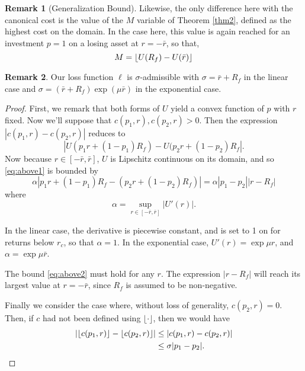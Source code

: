 \documentclass[11pt]{article}
\DeclarePairedDelimiter\floor{\lfloor}{\rfloor}
\theoremstyle{plain}
\theoremstyle{definition}
\newtheorem*{rem}{Remark}
\begin{document}
\begin{rem}[Generalization Bound]
  Likewise, the only difference here with the canonical cost is the value of the $M$
  variable of Theorem \ref{thm2}, defined as the highest cost on the domain. In the case
  here, this value is again reached for an investment $p=1$ on a losing asset at $r=-\bar
  r$, so that,
  \begin{equation}
    M = \floor{U(R_f) - U(\bar r)}
  \end{equation}
\end{rem}







\newpage
\begin{rem}
  Our loss function $\ell$ is $\sigma$-admissible with $\sigma=\bar r+R_f$ in the linear
  case and $\sigma=(\bar r+R_f)\exp(\mu\bar r)$ in the exponential case.
\end{rem}

\begin{proof}
  First, we remark that both forms of $U$ yield a convex function of $p$ with $r$ fixed. 
  Now we'll suppose that $c(p_1,r), c(p_2,r) > 0$. Then the expression
  $|c(p_1,r)-c(p_2,r)|$ reduces to
  \begin{equation}
    |U(p_1r + (1-p_1)R_f) - U(p_2r + (1-p_2)R_f|.
  \end{equation}
  Now because $r\in[-\bar r,\bar r]$, $U$ is Lipschitz continuous on its domain, and so
  \eqref{eq:above1} is bounded by
  \begin{equation}
    \alpha |p_1r + (1-p_1)R_f - (p_2r + (1-p_2)R_f)| = \alpha|p_1-p_2||r-R_f|
  \end{equation}
  where
  \begin{equation}
    \alpha = \sup_{r\in[-\bar r,\bar r]} |U'(r)|.
  \end{equation}

  In the linear case, the derivative is piecewise constant, and is set to 1 on for returns
  below $r_c$, so that $\alpha=1$. In the exponential case, $U'(r) = \exp\mu r$, and
  $\alpha = \exp \mu \bar r$.

  The bound \eqref{eq:above2} must hold for any $r$. The expression $|r-R_f|$ will reach
  its largest value at $r=-\bar r$, since $R_f$ is assumed to be non-negative.

  Finally we consider the case where, without loss of generality, $c(p_2,r)=0$. Then, if
  $c$ had not been defined using $\lfloor\cdot\rfloor$, then we would have
  \begin{align}
    |\floor*{c(p_1,r)} - \floor*{c(p_2,r)}| &\leq |c(p_1,r) - c(p_2,r)|\\
    &\leq \sigma|p_1-p_2|.\qedhere
  \end{align}
\end{proof}
\end{document}
